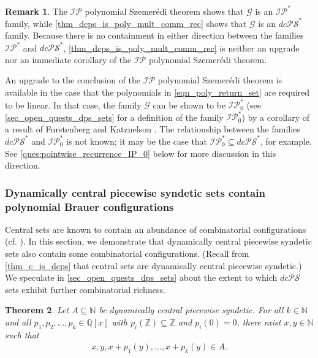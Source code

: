 \documentclass[letter,11pt]{article}
\theoremstyle{plain}
\newtheorem{theorem}{Theorem}
\theoremstyle{definition}
\newtheorem{remark}[theorem]{Remark}
\theoremstyle{plain}
\theoremstyle{plain}
\numberwithin{equation}{section}
\newcommand{\Szemeredi}{Szemer\'{e}di}
\newcommand{\N}{\mathbb{N}}
\newcommand{\Z}{\mathbb{Z}}
\newcommand{\Q}{\mathbb{Q}}
\newcommand{\dcPS}{dc\mathcal{PS}}
\newcommand{\IP}{\mathcal{IP}}
\newcommand{\filtertwo}{\mathscr{G}}
\newcommand{\familytwo}{\mathscr{G}}
\begin{document}
\begin{remark}
The $\IP$ polynomial \Szemeredi{} theorem \cite[Thm 7.12]{Bergelson-McCutcheon-IPpolynomialSzemeredi} shows that $\filtertwo$ is an $\IP^*$ family, while \cref{thm_dcps_is_poly_mult_comm_rec} shows that $\filtertwo$ is an $\dcPS^*$ family. Because there is no containment in either direction between the families $\IP^*$ and $\dcPS^*$, \cref{thm_dcps_is_poly_mult_comm_rec} is neither an upgrade nor an immediate corollary of the $\IP$ polynomial \Szemeredi{} theorem.

An upgrade to the conclusion of the $\IP$ polynomial \Szemeredi{} theorem is available in the case that the polynomials in \eqref{eqn_poly_return_set} are required to be linear.  In that case, the family $\familytwo$ can be shown to be $\IP_0^*$ (see \cref{sec_open_quests_dps_sets} for a definition of the family $\IP_0^*$) by a corollary of a result of Furstenberg and Katznelson \cite[Thm. 10.3]{furstenberg_katznelson_1985}.  The relationship between the families $\dcPS^*$ and $\IP_0^*$ is not known; it may be the case that $\IP_0^* \subseteq \dcPS^*$, for example.  See \cref{ques:pointwise_recurrence_IP_0} below for more discussion in this direction.
\end{remark}

\subsubsection{Dynamically central piecewise syndetic sets contain polynomial Brauer configurations}

Central sets are known to contain an abundance of combinatorial configurations (cf. \cite[Ch. 14]{hindman_strauss_book_2012}). In this section, we demonstrate that dynamically central piecewise syndetic sets also contain some combinatorial configurations.  (Recall from \cref{thm_c_is_dcps} that central sets are dynamically central piecewise syndetic.)  We speculate in \cref{sec_open_quests_dps_sets} about the extent to which $\dcPS$ sets exhibit further combinatorial richness.

\begin{theorem}
\label{thm:Brauer_and_dcPS}
    Let $A \subseteq \N$ be dynamically central piecewise syndetic. For all $k \in \N$ and all $p_1, p_2, \ldots, p_k \in \Q[x]$ with $p_i(\Z) \subseteq \Z$ and $p_i(0) = 0$, there exist $x, y \in \N$ such that
    \begin{align}
        \label{eqn_poly_brauer_in_dcps}
        x, y, x + p_1(y), \ldots, x + p_k(y) \in A.
    \end{align}
\end{theorem}
\end{document}
